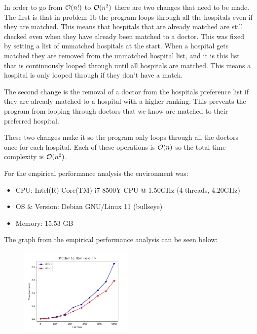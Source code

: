 \documentclass{hw}
\begin{document}
\begin{problem}
    \begin{solution}
    In order to go from $\mathcal{O}(n!)$ to $\mathcal{O}(n^2)$ there are two changes that need to be made. The first is that in problem-1b the program loops through all the hospitals even if they are matched. This means that hospitals that are already matched are still checked even when they have already been matched to a doctor. This was fixed by setting a list of unmatched hospitals at the start. When a hospital gets matched they are removed from the unmatched hospital list, and it is this list that is continuously looped through until all hospitals are matched. This means a hospital is only looped through if they don't have a match.
    
    The second change is the removal of a doctor from the hospitals preference list if they are already matched to a hospital with a higher ranking. This prevents the program from looping through doctors that we know are matched to their preferred hospital.
    
    These two changes make it so the program only loops through all the doctors once for each hospital. Each of these operations is $\mathcal{O}(n)$ so the total time complexity is $\mathcal{O}(n^2)$.
    
    For the empirical performance analysis the environment was:
        \begin{itemize}
            \item CPU: Intel(R) Core(TM) i7-8500Y CPU @ 1.50GHz (4 threads, 4.20GHz)
            \item OS \& Version: Debian GNU/Linux 11 (bullseye)
            \item Memory: 15.53 GB
        \end{itemize}
        
    The graph from the empirical performance analysis can be seen below:
    \begin{figure}[ht]
      \centering
          \includegraphics[width=0.5\textwidth]{figures/problem-1c.png}
    \end{figure}
    
    \end{solution}

\end{problem}
\end{document}
